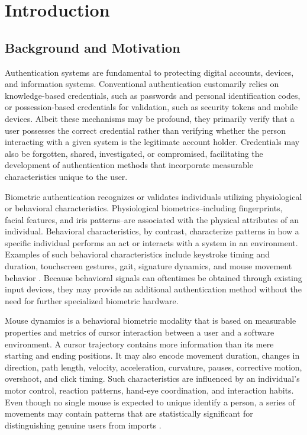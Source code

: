 \documentclass[conference]{IEEEtran}
\begin{document}
\section{Introduction}
\subsection{Background and Motivation}
Authentication systems are fundamental to protecting digital accounts, devices, and information systems. Conventional authentication customarily relies on knowledge-based credentials, such as passwords and personal identification codes, or possession-based credentials for validation, such as security tokens and mobile devices. Albeit these mechanisms may be profound, they primarily verify that a user possesses the correct credential rather than verifying whether the person interacting with a given system is the legitimate account holder. Credentials may also be forgotten, shared, investigated, or compromised, facilitating the development of authentication methods that incorporate measurable characteristics unique to the user. 

Biometric authentication recognizes or validates individuals utilizing physiological or behavioral characteristics. Physiological biometrics--including fingerprints, facial features, and iris patterns--are associated with the physical attributes of an individual. Behavioral characteristics, by contrast, characterize patterns in how a specific individual performs an act or interacts with a system in an environment. Examples of such behavioral characteristics include keystroke timing and duration, touchscreen gestures, gait, signature dynamics, and mouse movement behavior \cite{nistBiometrics,khanMouseSurvey}. Because behavioral signals can oftentimes be obtained through existing input devices, they may provide an additional authentication method without the need for further specialized biometric hardware. 

Mouse dynamics is a behavioral biometric modality that is based on measurable properties and metrics of cursor interaction between a user and a software environment. A cursor trajectory contains more information than its mere starting and ending positions. It may also encode movement duration, changes in direction, path length, velocity, acceleration, curvature, pauses, corrective motion, overshoot, and click timing. Such characteristics are influenced by an individual's motor control, reaction patterns, hand-eye coordination, and interaction habits. Even though no single mouse is expected to unique identify a person, a series of movements may contain patterns that are statistically significant for distinguishing genuine users from imports \cite{khanMouseSurvey,deutschmannContinuousAuthentication}.
\end{document}
